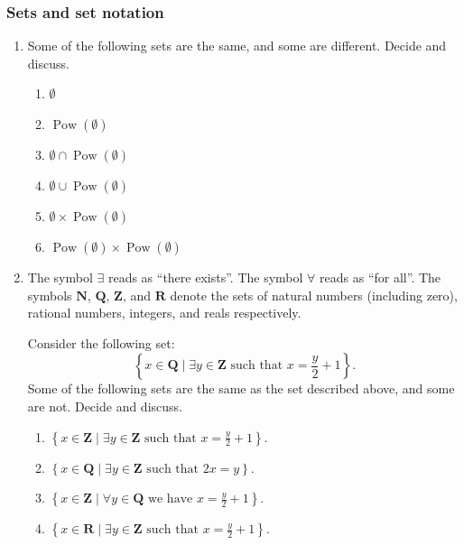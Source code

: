 \documentclass{amsart}
\begin{document}
\subsubsection{Sets and set notation}
\label{sec:org80c2a5b}
\begin{enumerate}
\item Some of the following sets are the same, and some are different. Decide and discuss.
\begin{enumerate}
\item \(\emptyset\)
\item \(\operatorname{Pow}(\emptyset)\)
\item \(\emptyset \cap \operatorname{Pow}(\emptyset)\)
\item \(\emptyset \cup \operatorname{Pow}(\emptyset)\)
\item \(\emptyset \times \operatorname{Pow}(\emptyset)\)
\item \(\operatorname{Pow}(\emptyset) \times \operatorname{Pow}(\emptyset)\)
\end{enumerate}

\item The symbol \(\exists\) reads as ``there exists''.
The symbol \(\forall\) reads as ``for all''.
The symbols \(\mathbf{N}\), \(\mathbf{Q}\), \(\mathbf{Z}\), and \(\mathbf{R}\) denote the sets of natural numbers (including zero), rational numbers, integers, and reals respectively.

Consider the following set:
\[\left\{x \in \mathbf{Q}\mid \exists y \in \mathbf{Z} \text{ such that } x = \displaystyle \frac{y}{2} + 1\right\}.\]
Some of the following sets are the same as the set described above, and some are not. Decide and discuss.
\begin{enumerate}
\item \(\displaystyle \left\{x \in \mathbf{Z} \mid \exists y \in \mathbf{Z}\text{ such that } x = \displaystyle \frac{y}{2} + 1\right\}\).
\item \(\displaystyle \left\{x \in \mathbf{Q} \mid \exists y \in \mathbf{Z}\text{ such that } 2x = y \right\}\).
\item \(\displaystyle \left\{x \in \mathbf{Z} \mid \forall y \in \mathbf{Q}\text{ we have } x = \displaystyle \frac{y}{2} + 1\right\}\).
\item \(\displaystyle \left\{x \in \mathbf{R} \mid \exists y \in \mathbf{Z}\text{ such that } x = \displaystyle \frac{y}{2} + 1\right\}\).
\end{enumerate}
\end{enumerate}
\end{document}

